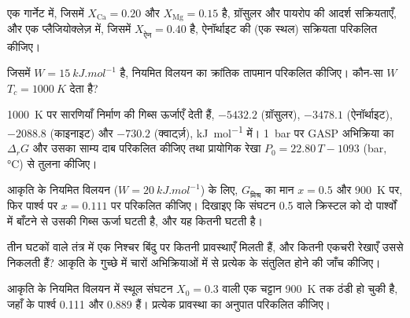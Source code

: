 \begin{exercise}[$\star$]\label{exo:b3:petrological-thermodynamics:3}
एक गार्नेट में, जिसमें
$X_{\text{Ca}} = 0.20$ और $X_{\text{Mg}} = 0.15$ है, ग्रॉसुलर और पायरोप की आदर्श सक्रियताएँ,
और एक प्लैजियोक्लेज़ में, जिसमें $X_{\text{ऐन}} = 0.40$ है, ऐनॉर्थाइट की (एक स्थल) सक्रियता परिकलित कीजिए।
\end{exercise}

\begin{exercise}[$\star$]\label{exo:b3:petrological-thermodynamics:4}
जिसमें $W =
\qty{15}{kJ.mol^{-1}}$ है, नियमित विलयन का क्रांतिक तापमान परिकलित कीजिए। कौन-सा $W$ $T_c = \qty{1000}{K}$ देता है?
\end{exercise}

\begin{exercise}[$\star\star$]\label{exo:b3:petrological-thermodynamics:5}
\qty{1000}{K} पर सारणियाँ निर्माण की गिब्स ऊर्जाएँ देती हैं,
$-5432.2$ (ग्रॉसुलर), $-3478.1$ (ऐनॉर्थाइट), $-2088.8$ (काइनाइट) और $-730.2$
(क्वार्ट्ज़), \unit{kJ.mol^{-1}} में। \qty{1}{bar} पर GASP अभिक्रिया का $\Delta_rG$ और
उसका साम्य दाब परिकलित कीजिए तथा प्रायोगिक
रेखा $P_0 = 22.80\,T - 1093$ (bar, \unit{\celsius}) से तुलना कीजिए।
\end{exercise}

\begin{exercise}[$\star\star$]\label{exo:b3:petrological-thermodynamics:6}
आकृति के नियमित विलयन ($W = \qty{20}{kJ.mol^{-1}}$) के लिए,
$G_{\text{मिश्र}}$ का मान $x = 0.5$ और \qty{900}{K} पर, फिर  पार्श्व पर $x =
0.111$ पर परिकलित कीजिए। दिखाइए कि संघटन 0.5 वाले क्रिस्टल को दो पार्श्वों में बाँटने से
उसकी गिब्स ऊर्जा घटती है, और यह कितनी घटती है।
\end{exercise}

\begin{exercise}[$\star\star$]\label{exo:b3:petrological-thermodynamics:7}
तीन घटकों वाले तंत्र में एक निश्चर बिंदु पर कितनी प्रावस्थाएँ मिलती हैं, और कितनी
एकचरी रेखाएँ उससे निकलती हैं? आकृति के गुच्छे में
चारों अभिक्रियाओं में से प्रत्येक के संतुलित होने की जाँच कीजिए।
\end{exercise}

\begin{exercise}[$\star\star$]\label{exo:b3:petrological-thermodynamics:8}
आकृति के नियमित विलयन में स्थूल संघटन $X_0 = 0.3$ वाली एक चट्टान
\qty{900}{K} तक ठंडी हो चुकी है, जहाँ  के पार्श्व 0.111 और 0.889 हैं।
प्रत्येक प्रावस्था का अनुपात परिकलित कीजिए।
\end{exercise}

